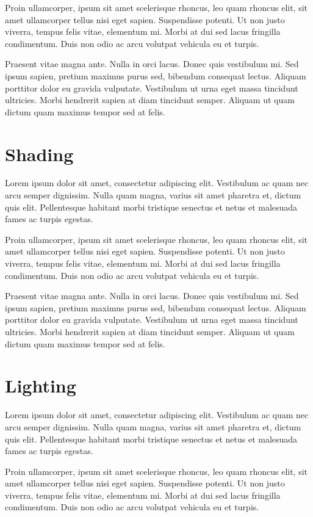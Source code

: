 \documentclass[12pt,a4paper]{report}
\begin{document}
Proin ullamcorper, ipsum sit amet scelerisque rhoncus, leo quam rhoncus elit, sit amet ullamcorper tellus nisi eget sapien. Suspendisse potenti. Ut non justo viverra, tempus felis vitae, elementum mi. Morbi at dui sed lacus fringilla condimentum. Duis non odio ac arcu volutpat vehicula eu et turpis.

Praesent vitae magna ante. Nulla in orci lacus. Donec quis vestibulum mi. Sed ipsum sapien, pretium maximus purus sed, bibendum consequat lectus. Aliquam porttitor dolor eu gravida vulputate. Vestibulum ut urna eget massa tincidunt ultricies. Morbi hendrerit sapien at diam tincidunt semper. Aliquam ut quam dictum quam maximus tempor sed at felis.

\section{Shading}

Lorem ipsum dolor sit amet, consectetur adipiscing elit. Vestibulum ac quam nec arcu semper dignissim. Nulla quam magna, varius sit amet pharetra et, dictum quis elit. Pellentesque habitant morbi tristique senectus et netus et malesuada fames ac turpis egestas.

Proin ullamcorper, ipsum sit amet scelerisque rhoncus, leo quam rhoncus elit, sit amet ullamcorper tellus nisi eget sapien. Suspendisse potenti. Ut non justo viverra, tempus felis vitae, elementum mi. Morbi at dui sed lacus fringilla condimentum. Duis non odio ac arcu volutpat vehicula eu et turpis.

Praesent vitae magna ante. Nulla in orci lacus. Donec quis vestibulum mi. Sed ipsum sapien, pretium maximus purus sed, bibendum consequat lectus. Aliquam porttitor dolor eu gravida vulputate. Vestibulum ut urna eget massa tincidunt ultricies. Morbi hendrerit sapien at diam tincidunt semper. Aliquam ut quam dictum quam maximus tempor sed at felis.

\section{Lighting}

Lorem ipsum dolor sit amet, consectetur adipiscing elit. Vestibulum ac quam nec arcu semper dignissim. Nulla quam magna, varius sit amet pharetra et, dictum quis elit. Pellentesque habitant morbi tristique senectus et netus et malesuada fames ac turpis egestas.

Proin ullamcorper, ipsum sit amet scelerisque rhoncus, leo quam rhoncus elit, sit amet ullamcorper tellus nisi eget sapien. Suspendisse potenti. Ut non justo viverra, tempus felis vitae, elementum mi. Morbi at dui sed lacus fringilla condimentum. Duis non odio ac arcu volutpat vehicula eu et turpis.
\end{document}

